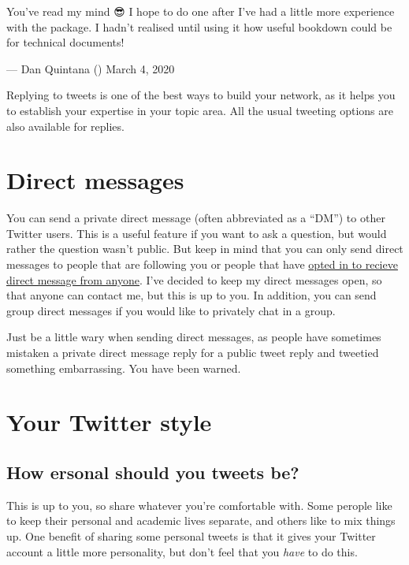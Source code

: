 \documentclass[]{book}
\begin{document}
You've read my mind 😎 I hope to do one after I've had a little more experience with the package. I hadn't realised until using it how useful bookdown could be for technical documents!

--- Dan Quintana (\citet{dsquintana}) March 4, 2020

Replying to tweets is one of the best ways to build your network, as it helps you to establish your expertise in your topic area. All the usual tweeting options are also available for replies.

\hypertarget{direct-messages}{%
\section{Direct messages}\label{direct-messages}}

You can send a private direct message (often abbreviated as a ``DM'') to other Twitter users. This is a useful feature if you want to ask a question, but would rather the question wasn't public. But keep in mind that you can only send direct messages to people that are following you or people that have \href{https://help.twitter.com/en/using-twitter/direct-messages\#receive}{opted in to recieve direct message from anyone}. I've decided to keep my direct messages open, so that anyone can contact me, but this is up to you. In addition, you can send group direct messages if you would like to privately chat in a group.

Just be a little wary when sending direct messages, as people have sometimes mistaken a private direct message reply for a public tweet reply and tweetied something embarrassing. You have been warned.

\hypertarget{your-twitter-style}{%
\section{Your Twitter style}\label{your-twitter-style}}

\hypertarget{how-ersonal-should-you-tweets-be}{%
\subsection{How ersonal should you tweets be?}\label{how-ersonal-should-you-tweets-be}}

This is up to you, so share whatever you're comfortable with. Some perople like to keep their personal and academic lives separate, and others like to mix things up. One benefit of sharing some personal tweets is that it gives your Twitter account a little more personality, but don't feel that you \emph{have} to do this.
\end{document}
